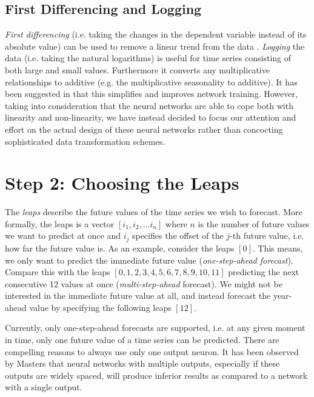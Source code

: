 \subsection{First Differencing and Logging}

\textit{First differencing} (i.e. taking the changes in the dependent variable instead of its absolute value) can be used to remove a linear trend from the data \cite{Kaastra95}. \textit{Logging} the data (i.e. taking the natural logarithms) is useful for time series consisting of both large and small values. Furthermore it converts any multiplicative relationships to additive (e.g. the multiplicative seasonality to additive). It has been suggested in \cite{Masters93} that this simplifies and improves network training.
However, taking into consideration that the neural networks are able to cope both with linearity and non-linearity, we have instead decided to focus our attention and effort on the actual design of these neural networks rather than concocting sophisticated data transformation schemes.

\section{Step 2: Choosing the Leaps}

The \textit{leaps} describe the future values of the time series we wish to forecast. More formally, the leaps is a vector $ [i_1, i_2, \ldots i_n] $ where $ n $ is the number of future values we want to predict at once and $ i_j $ specifies the offset of the $ j $-th future value, i.e. how far the future value is. As an example, consider the leaps $ [ 0 ] $. This means, we only want to predict the immediate future value (\textit{one-step-ahead forecast}). Compare this with the leaps $ [ 0, 1, 2, 3, 4, 5, 6, 7, 8, 9, 10, 11 ] $ predicting the next consecutive 12 values at once (\textit{multi-step-ahead} forecast). We might not be interested in the immediate future value at all, and instead forecast the year-ahead value by specifying the following leaps $ [ 12 ] $.

Currently, only one-step-ahead forecasts are supported, i.e. at any given moment in time, only one future value of a time series can be predicted. There are compelling reasons to always use only one output neuron. It has been observed by Masters \cite{Masters93} that neural networks with multiple outputs, especially if these outputs are widely spaced, will produce inferior results as compared to a network with a single output.

